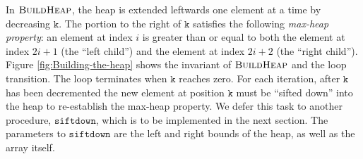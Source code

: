 \documentclass[english,submission]{eptcs}
\begin{document}
In $\textsc{BuildHeap}$, the heap is extended leftwards one element
at a time by decreasing $\mathtt{k}$. The portion to the right of
$\mathtt{k}$ satisfies the following \emph{max-heap property}: an
element at index $i$ is greater than or equal to both the element
at index $2i+1$ (the {}``left child'') and the element at index
$2i+2$ (the {}``right child''). Figure \ref{fig:Building-the-heap}
shows the invariant of $\textsc{BuildHeap}$ and the loop transition.
The loop terminates when $\mathtt{k}$ reaches zero. For each iteration,
after $\mathtt{k}$ has been decremented the new element at position
$\mathtt{k}$ must be {}``sifted down'' into the heap to re-establish
the max-heap property. We defer this task to another procedure, $\mathtt{siftdown}$,
which is to be implemented in the next section. The parameters to
$\mathtt{siftdown}$ are the left and right bounds of the heap, as
well as the array itself. 
\end{document}
